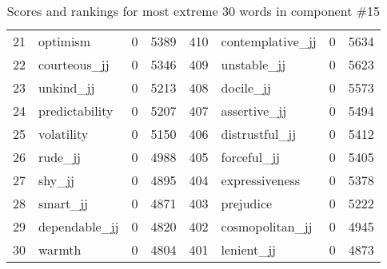 \begin{table}[tbp]
\begin{tabular}{| rlr@{.}l | rlr@{.}l |}
    21 & optimism & 0 & 5389    &    410 & contemplative\_jj & 0 & 5634 \\
    22 & courteous\_jj & 0 & 5346    &    409 & unstable\_jj & 0 & 5623 \\
    23 & unkind\_jj & 0 & 5213    &    408 & docile\_jj & 0 & 5573 \\
    24 & predictability & 0 & 5207    &    407 & assertive\_jj & 0 & 5494 \\
    25 & volatility & 0 & 5150    &    406 & distrustful\_jj & 0 & 5412 \\
    26 & rude\_jj & 0 & 4988    &    405 & forceful\_jj & 0 & 5405 \\
    27 & shy\_jj & 0 & 4895    &    404 & expressiveness & 0 & 5378 \\
    28 & smart\_jj & 0 & 4871    &    403 & prejudice & 0 & 5222 \\
    29 & dependable\_jj & 0 & 4820    &    402 & cosmopolitan\_jj & 0 & 4945 \\
    30 & warmth & 0 & 4804    &    401 & lenient\_jj & 0 & 4873 \\
    \hline
    \end{tabular}
    \caption{Scores and rankings for most extreme 30 words in component \#15} 
\end{table}
\clearpage
